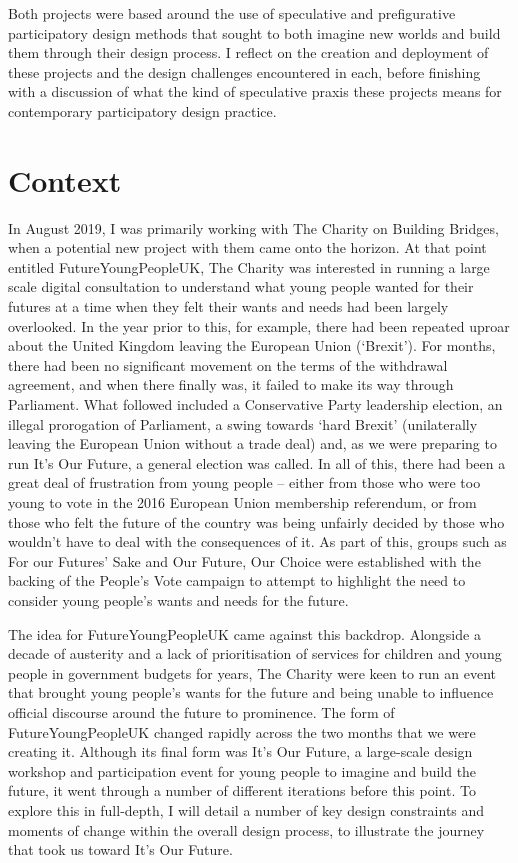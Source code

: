 Both projects were based around the use of speculative and prefigurative participatory design methods that sought to both imagine new worlds and build them through their design process. I reflect on the creation and deployment of these projects and the design challenges encountered in each, before finishing with a discussion of what the kind of speculative praxis these projects means for contemporary participatory design practice.


\section{Context}

In August 2019, I was primarily working with The Charity on Building Bridges, when a potential new project with them came onto the horizon. At that point entitled FutureYoungPeopleUK, The Charity was interested in running a large scale digital consultation to understand what young people wanted for their futures at a time when they felt their wants and needs had been largely overlooked. In the year prior to this, for example, there had been repeated uproar about the United Kingdom leaving the European Union (‘Brexit’). For months, there had been no significant movement on the terms of the withdrawal agreement, and when there finally was, it failed to make its way through Parliament. What followed included a Conservative Party leadership election, an illegal prorogation of Parliament, a swing towards ‘hard Brexit’ (unilaterally leaving the European Union without a trade deal) and, as we were preparing to run It’s Our Future, a general election was called. In all of this, there had been a great deal of frustration from young people – either from those who were too young to vote in the 2016 European Union membership referendum, or from those who felt the future of the country was being unfairly decided by those who wouldn’t have to deal with the consequences of it. As part of this, groups such as For our Futures’ Sake and Our Future, Our Choice were established with the backing of the People’s Vote campaign to attempt to highlight the need to consider young people’s wants and needs for the future.

The idea for FutureYoungPeopleUK came against this backdrop. Alongside a decade of austerity and a lack of prioritisation of services for children and young people in government budgets for years, The Charity were keen to run an event that brought young people’s wants for the future and being unable to influence official discourse around the future to prominence. The form of FutureYoungPeopleUK changed rapidly across the two months that we were creating it. Although its final form was It’s Our Future, a large-scale design workshop and participation event for young people to imagine and build the future, it went through a number of different iterations before this point. To explore this in full-depth, I will detail a number of key design constraints and moments of change within the overall design process, to illustrate the journey that took us toward It’s Our Future.

